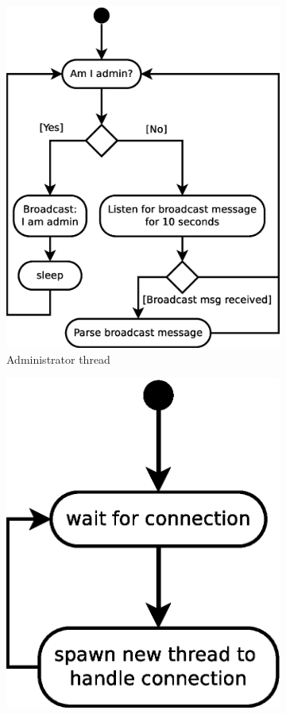 \begin{figure}[ht!]
\begin{subfigure}[b]{0.3\textwidth}
        \includegraphics[scale=0.35]{eps/admin_th}
        \caption{Administrator thread}
        \label{fig:adminthread}
    \end{subfigure}
    \qquad
    \begin{subfigure}[b]{0.3\textwidth}
        \includegraphics[scale=0.35]{eps/data_th}

\end{subfigure}
\end{figure}
